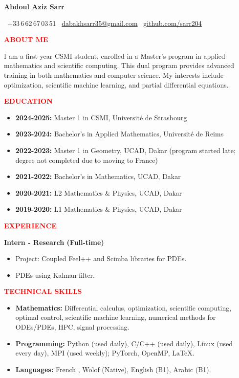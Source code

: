 \documentclass[12pt,a4paper]{article}
\newcommand{\cvsection}[1]{%
  \vspace{10pt}
  \noindent\makebox[\linewidth]{\rule{\textwidth}{1.5pt}}
  \vspace{2pt}
  \noindent\textcolor{red}{\textbf{\LARGE #1}}
  \vspace{2pt}
  \noindent\makebox[\linewidth]{\rule{\textwidth}{0.5pt}}
  \vspace{6pt}
}
\begin{document}
\begin{center}
  {\Huge \textbf{Abdoul Aziz Sarr}}
  
  \faPhone\ +33\,6\,62\,67\,03\,51\quad
  \faEnvelope\ \href{mailto:dabakhsarr35@gmail.com}{dabakhsarr35@gmail.com} \quad
  \faGithub\ \href{https://github.com/sarr204}{github.com/sarr204}
\end{center}

\vspace{10pt}

\cvsection{ABOUT ME}
I am a first-year CSMI student, enrolled in a Master's program in applied mathematics and scientific computing. This dual program provides advanced training in both mathematics and computer science. My interests include optimization, scientific machine learning, and partial differential equations.

\cvsection{EDUCATION}
\begin{itemize}[leftmargin=*,itemsep=3pt]
  \item \textbf{2024-2025:} Master 1 in CSMI, Université de Strasbourg
  \item \textbf{2023-2024:} Bachelor's in Applied Mathematics, Université de Reims
  \item \textbf{2022-2023:} Master 1 in Geometry, UCAD, Dakar (program started late; degree not completed due to moving to France)
  \item \textbf{2021-2022:} Bachelor's in Mathematics, UCAD, Dakar
  \item \textbf{2020-2021:} L2 Mathematics \& Physics, UCAD, Dakar
  \item \textbf{2019-2020:} L1 Mathematics \& Physics, UCAD, Dakar
\end{itemize}

\cvsection{EXPERIENCE}
\textbf{Intern - Research (Full-time)}
\begin{itemize}[leftmargin=*,noitemsep]
  \item Project: Coupled Feel++ and Scimba libraries for PDEs.
  \item PDEs using Kalman filter.
\end{itemize}

\cvsection{TECHNICAL SKILLS}
\begin{itemize}[leftmargin=*,noitemsep]
  \item \textbf{Mathematics:} Differential calculus, optimization, scientific computing, optimal control, scientific machine learning, numerical methods for ODEs/PDEs, HPC, signal processing.
  \item \textbf{Programming:} Python (used daily), C/C++ (used daily), Linux (used every day), MPI (used weekly); PyTorch, OpenMP, \LaTeX.
  \item \textbf{Languages:} French , Wolof (Native), English (B1), Arabic (B1).
\end{itemize}
\end{document}
